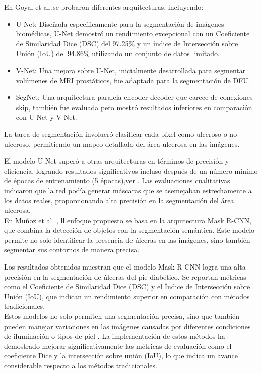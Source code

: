 \documentclass[12pt]{article}
\begin{document}
		
		En Goyal et al.\cite{goyal2017fully},se probaron diferentes arquitecturas, incluyendo:
		\begin{itemize}
			\item U-Net: Diseñada específicamente para la segmentación de imágenes biomédicas, U-Net demostró un rendimiento excepcional con un Coeficiente de Similaridad Dice (DSC) del 97.25\% y un índice de Intersección sobre Unión (IoU) del 94.86\% utilizando un conjunto de datos limitado.
			\item V-Net: Una mejora sobre U-Net, inicialmente desarrollada para segmentar volúmenes de MRI prostáticos, fue adaptada para la segmentación de DFU.
			\item SegNet: Una arquitectura paralela encoder-decoder que carece de conexiones skip, también fue evaluada pero mostró resultados inferiores en comparación con U-Net y V-Net.
		\end{itemize}
		
		La tarea de segmentación involucró clasificar cada píxel como ulceroso o no ulceroso, permitiendo un mapeo detallado del área ulcerosa en las imágenes.
		
		El modelo U-Net superó a otras arquitecturas en términos de precisión y eficiencia, logrando resultados significativos incluso después de un número mínimo de épocas de entrenamiento (5 épocas),ver \cite{goyal2017fully}. Las evaluaciones cualitativas indicaron que la red podía generar máscaras que se asemejaban estrechamente a los datos reales, proporcionando alta precisión en la segmentación del área ulcerosa.
		\\
		
		En Mu\~noz et al. \cite{munoz2024automatic}, ll enfoque propuesto se basa en la arquitectura Mask R-CNN, que combina la detección de objetos con la segmentación semántica. Este modelo permite no solo identificar la presencia de úlceras en las imágenes, sino también segmentar sus contornos de manera precisa.
		
		Los resultados obtenidos muestran que el modelo Mask R-CNN logra una alta precisión en la segmentación de úlceras del pie diabético. Se reportan métricas como el Coeficiente de Similaridad Dice (DSC) y el Índice de Intersección sobre Unión (IoU), que indican un rendimiento superior en comparación con métodos tradicionales. 
		\\
		  
		Estos modelos no solo permiten una segmentación precisa, sino que también pueden manejar variaciones en las imágenes causadas por diferentes condiciones de iluminación o tipos de piel \cite{Wang2020}. La implementación de estos métodos ha demostrado mejorar significativamente las métricas de evaluación como el coeficiente Dice y la intersección sobre unión (IoU), lo que indica un avance considerable respecto a los métodos tradicionales.
		\\
		
\end{document}
